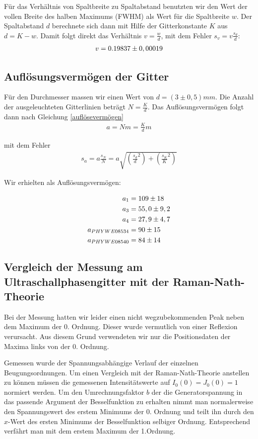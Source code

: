 \documentclass[12pt]{article}
\begin{document}
Für das Verhältnis von Spaltbreite zu Spaltabstand benutzten wir den Wert der vollen Breite des halben Maximums (FWHM) als Wert für die Spaltbreite $w$. Der Spaltabstand $d$ berechnete sich dann mit Hilfe der Gitterkonstante $K$ aus $d= K - w$. Damit folgt direkt das Verhältnis $v=\frac{w}{d}$, mit dem Fehler $s_v=v\frac{s_d}{d}$:
\begin{align}
 \notag
v=0.19837 \pm 0,00019
\end{align}

\subsection{Auflösungsvermögen der Gitter}
Für den Durchmesser massen wir einen Wert von $d=(3 \pm 0,5)mm$. Die Anzahl der ausgeleuchteten Gitterlinien beträgt
$N=\frac{K}{d}$. Das Auflösungsvermögen folgt dann nach Gleichung \ref{auflösevermögen} 
\begin{align}
 a=Nm=\frac{K}{d}m
\end{align}

mit dem Fehler 
\begin{align}
 s_a=a\frac{s_N}{N}=a\sqrt{\left( \frac{s_d}{d}^2 \right) + \left( \frac{s_K}{K}^2 \right) }
\end{align}

Wir erhielten als Auflösungsvermögen:

\begin{align}
 \notag
a_1 &=  109 \pm  18\\
 \notag
a_3 &=  55,0 \pm  9,2\\
 \notag
a_4 &=  27,9 \pm  4,7\\
 \notag
a_{PHYWE08534} &= 90 \pm 15\\
 \notag
a_{PHYWE08540} &= 84 \pm 14
\end{align}

\subsection{Vergleich der Messung am Ultraschallphasengitter mit der Raman-Nath-Theorie}
Bei der Messung hatten wir leider einen nicht wegzubekommenden Peak neben dem Maximum der 0. Ordnung. Dieser wurde vermutlich von einer Reflexion
verursacht. Aus diesem Grund verwendeten wir nur die Positionsdaten der Maxima links von der 0. Ordnung.

Gemessen wurde der Spannungsabhängige Verlauf der einzelnen Beugungsordnungen. Um einen Vergleich mit der Raman-Nath-Theorie anstellen zu können müssen
die gemessenen Intensitätswerte auf $I_0(0) = J_0(0) = 1$ normiert werden. Um den Umrechnungsfaktor $b$ der die Generatorspannung in das passende Argument
der Besselfunktion zu erhalten nimmt man normalerweise den Spannungswert des erstem Minimums der 0. Ordnung und teilt ihn durch den $x$-Wert des ersten
Minimums der Besselfunktion selbiger Ordnung. Entsprechend verfährt man mit dem erstem Maximum der 1.Ordnung. 
\end{document}
